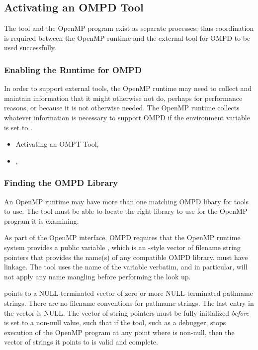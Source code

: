 \subsection{Activating an OMPD Tool}
\label{subsec:activating}

The tool and the OpenMP program
exist as separate processes; thus coordination is required between the OpenMP runtime
and the external tool for OMPD to be used successfully.

\subsubsection{Enabling the Runtime for OMPD}
\label{subsubsec:enabling-ompd}

In order to support external tools, the OpenMP runtime may need to collect
and maintain information that it might otherwise not do, perhaps
for performance reasons, or because it is not otherwise needed.
The OpenMP runtime collects whatever information is necessary
to support OMPD if the environment variable  is set to .

\crossreferences
\begin{itemize}
\item
  Activating an OMPT Tool, 
\item
  , 
\end{itemize}

\subsubsection{Finding the OMPD Library}
\label{subsubsec:finding-the-ompd}

An OpenMP runtime may have more than one matching OMPD libary for
tools to use.
The tool must be able to locate the right library to use
for the OpenMP program it is examining.

As part of the OpenMP interface, OMPD requires that the OpenMP
runtime system provides a public variable ,
which is an -style vector of filename string pointers that
provides the name(s) of any compatible OMPD library.
 must have  linkage.
The tool uses the name of the variable verbatim,
and in particular, will not apply any name mangling before
performing the look up.

 points to a NULL-terminated
vector of zero or more NULL-terminated pathname strings.
There are no filename conventions for pathname strings.
The last entry in the vector is NULL.
The vector of string pointers must be fully initialized \emph{before}
 is set to a non-null value,
such that if the tool, such as a debugger,
stops execution of the OpenMP program at any point where
 is non-null,
then the vector of strings it points to is valid and complete.

